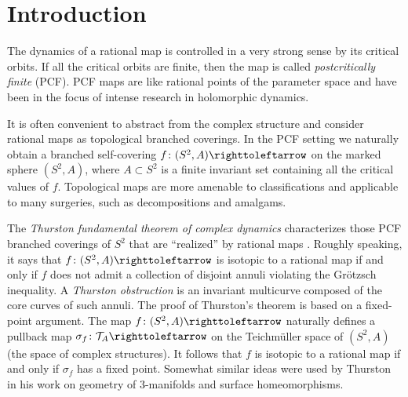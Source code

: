 \documentclass{amsart}
\theoremstyle{plain}
\theoremstyle{definition}
\theoremstyle{remark}
\newcommand{\TT}{{\mathcal T}}
\renewcommand{\sp}{{\ \ }}
\newcommand\selfmap{\righttoleftarrow}
\begin{document}



\maketitle
\setcounter{tocdepth}{1}


\tableofcontents


\section{Introduction}
The dynamics of a rational map is controlled in a very strong sense by its critical orbits. If all the critical orbits are finite, then the map is called \emph{postcritically finite} (PCF). PCF maps are like rational points of the parameter space and have been in the focus of intense research in holomorphic dynamics.


It is often convenient to abstract from the complex structure and consider rational maps as topological branched coverings.  In the PCF setting we naturally obtain a branched self-covering $f\colon (S^2,A)\selfmap$ on the marked sphere $(S^2, A)$, where $A\subset S^2$ is a finite invariant set containing all the critical values of $f$.  
Topological maps are more amenable to classifications and applicable to many surgeries, such as decompositions and amalgams. 

The \emph{Thurston fundamental theorem of complex dynamics} characterizes those PCF branched coverings of $S^2$ that are ``realized'' by rational maps \cite{DH_Th_char}. Roughly speaking, it says that $f\colon (S^2,A)\selfmap$ is isotopic to a rational map if and only if $f$ does not admit a collection of disjoint annuli violating the Gr\"otzsch inequality.  A \emph{Thurston obstruction} is an invariant multicurve composed of the core curves of such annuli.  The proof of Thurston's theorem is based on a fixed-point argument.  The map $f\colon (S^2,A)\selfmap$ naturally defines a pullback map $\sigma_f\colon \TT_A\selfmap$ on the Teichm\"uller space of $(S^2,A)$ (the space of complex structures). It follows that $f$ is isotopic to a rational map if and only if $\sigma_f$ has a fixed point.  Somewhat similar ideas were used by Thurston in his work on geometry of $3$-manifolds and surface homeomorphisms.
\end{document}
